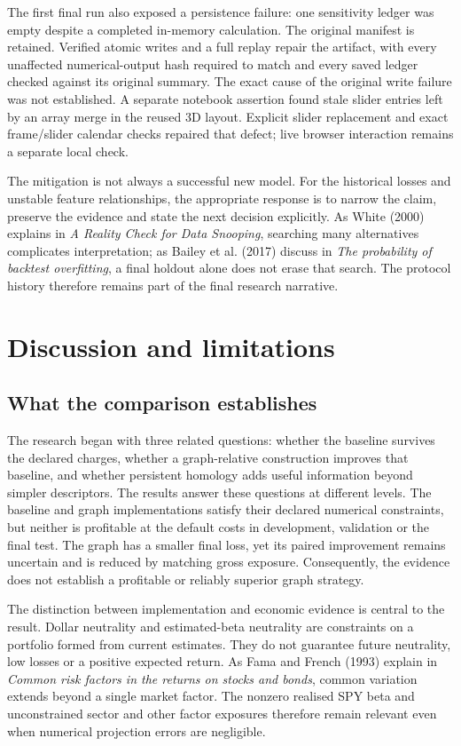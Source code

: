 \documentclass[12pt,a4paper,oneside]{article}
\newcommand{\bodyheading}[1]{\clearpage\section{#1}}
\begin{document}
The first final run also exposed a persistence failure: one sensitivity ledger was empty despite a completed in-memory calculation. The original manifest is retained. Verified atomic writes and a full replay repair the artifact, with every unaffected numerical-output hash required to match and every saved ledger checked against its original summary. The exact cause of the original write failure was not established. A separate notebook assertion found stale slider entries left by an array merge in the reused 3D layout. Explicit slider replacement and exact frame/slider calendar checks repaired that defect; live browser interaction remains a separate local check.


The mitigation is not always a successful new model. For the historical losses and unstable feature relationships, the appropriate response is to narrow the claim, preserve the evidence and state the next decision explicitly. As White (2000) explains in \textit{A Reality Check for Data Snooping}, searching many alternatives complicates interpretation; as Bailey et al. (2017) discuss in \textit{The probability of backtest overfitting}, a final holdout alone does not erase that search. The protocol history therefore remains part of the final research narrative.


\bodyheading{Discussion and limitations}

\subsection{What the comparison establishes}

The research began with three related questions: whether the baseline survives the declared charges, whether a graph-relative construction improves that baseline, and whether persistent homology adds useful information beyond simpler descriptors. The results answer these questions at different levels. The baseline and graph implementations satisfy their declared numerical constraints, but neither is profitable at the default costs in development, validation or the final test. The graph has a smaller final loss, yet its paired improvement remains uncertain and is reduced by matching gross exposure. Consequently, the evidence does not establish a profitable or reliably superior graph strategy.


The distinction between implementation and economic evidence is central to the result. Dollar neutrality and estimated-beta neutrality are constraints on a portfolio formed from current estimates. They do not guarantee future neutrality, low losses or a positive expected return. As Fama and French (1993) explain in \textit{Common risk factors in the returns on stocks and bonds}, common variation extends beyond a single market factor. The nonzero realised SPY beta and unconstrained sector and other factor exposures therefore remain relevant even when numerical projection errors are negligible.
\end{document}
